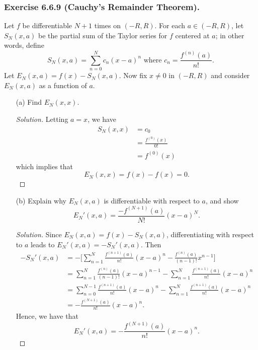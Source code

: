 \subsubsection{Exercise 6.6.9 (Cauchy's Remainder Theorem).} Let \( f  \) be differentiable \( N+1 \) times on \( (-R ,R ) \). For each \( a \in (-R ,R ) \), let \( S_{N}(x,a) \) be the partial sum of the Taylor series for \( f  \) centered at \( a  \); in other words, define 
\[  S_{N}(x,a) = \sum_{ n=0 }^{ N } c_{n} (x-a)^{n}  \text{  where } c_{n} = \frac{ f^{(n)}(a) }{ n! }.  \] 
Let \( E_{N}(x,a) = f(x) - S_{N}(x,a) \). Now fix \( x \neq 0  \) in \( (-R ,R ) \) and consider \( E_{N}(x,a)  \) as a function of \( a \).

\begin{enumerate}
    \item[(a)] Find \( E_{N}(x,x) \).
        \begin{proof}[Solution]
        Letting \( a = x  \), we have 
        \begin{align*}
            S_{N}(x,x) &= c_{0} \\
                       &= \frac{ f^{(0)}(x) }{ 0! } \\
                       &= f^{(0)}(x)
        \end{align*}
        which implies that 
        \[  E_{N}(x,x) = f(x) - f(x) = 0 .\]
        \end{proof}
    \item[(b)] Explain why \( E_{N}(x,a)  \) is differentiable with respect to \( a  \), and show 
        \[  E_{N}'(x,a) = \frac{ -f^{(N+1)}(a)  }{ N! } (x-a)^{N}. \]
        \begin{proof}[Solution]
        Since \( E_{N}(x,a) = f(x) - S_{N}(x,a)  \), differentiating with respect to \( a  \) leads to \(  E_{N}'(x,a) = - S_{N}'(x,a) \). Then 
        \begin{align*}  - S_{N}'(x,a) &=  - \Big[ \sum_{ n=1 }^{ N } \frac{ f^{(n+1)}(a) }{ n! } (x - a)^n - \frac{ f^{(n)}(a) }{ (n-1)! } x^{n-1}     \Big] \\
            &= \sum_{ n=1 }^{ N } \frac{ f^{(n)}(a) }{ (n-1)! } (x-a)^{n-1} -  \sum_{ n=1 }^{ N } \frac{ f^{(n+1)}(a) }{ n! } (x-a)^n \\
            &= \sum_{ n=0  }^{ N-1 } \frac{ f^{(n+1)}(a) }{ n! }  (x-a)^{n} - \sum_{ n=1 }^{ N  } \frac{ f^{(n+1)}(a)  }{ n! } (x-a)^{n} \\
            &= - \frac{ f^{(N+1)}(a)  }{ n! }  (x-a)^{n}.
        \end{align*} 
        Hence, we have that 
        \[ E_{N}'(x,a) = - \frac{ f^{(N+1)}(a) }{ n! } (x-a)^{n}. \]


\end{proof}
\end{enumerate}
